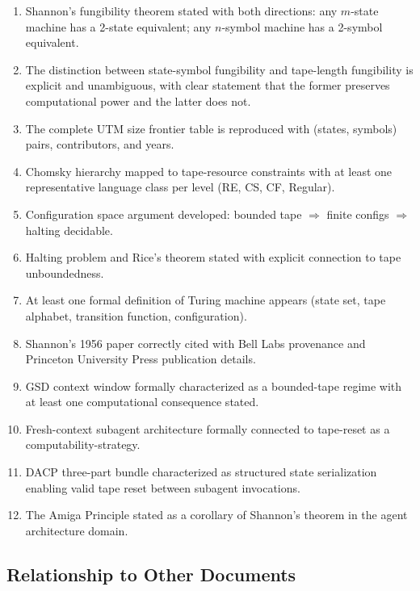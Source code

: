 \documentclass[11pt,letterpaper]{article}
\begin{document}
\begin{enumerate}
  \item Shannon's fungibility theorem stated with both directions: any $m$-state machine has a 2-state equivalent; any $n$-symbol machine has a 2-symbol equivalent.
  \item The distinction between state-symbol fungibility and tape-length fungibility is explicit and unambiguous, with clear statement that the former preserves computational power and the latter does not.
  \item The complete UTM size frontier table is reproduced with (states, symbols) pairs, contributors, and years.
  \item Chomsky hierarchy mapped to tape-resource constraints with at least one representative language class per level (RE, CS, CF, Regular).
  \item Configuration space argument developed: bounded tape $\Rightarrow$ finite configs $\Rightarrow$ halting decidable.
  \item Halting problem and Rice's theorem stated with explicit connection to tape unboundedness.
  \item At least one formal definition of Turing machine appears (state set, tape alphabet, transition function, configuration).
  \item Shannon's 1956 paper correctly cited with Bell Labs provenance and Princeton University Press publication details.
  \item GSD context window formally characterized as a bounded-tape regime with at least one computational consequence stated.
  \item Fresh-context subagent architecture formally connected to tape-reset as a computability-strategy.
  \item DACP three-part bundle characterized as structured state serialization enabling valid tape reset between subagent invocations.
  \item The Amiga Principle stated as a corollary of Shannon's theorem in the agent architecture domain.
\end{enumerate}

\subsection{Relationship to Other Documents}
\end{document}
